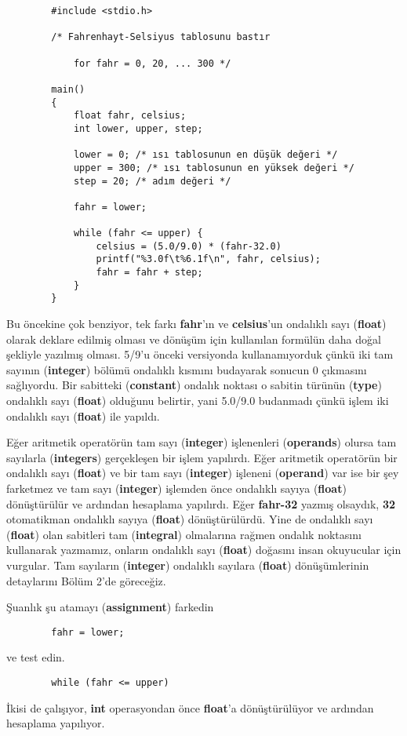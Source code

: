 \documentclass[a4paper,12pt,oneside]{book}
\begin{document}
\begin{lstlisting}
        #include <stdio.h>

        /* Fahrenhayt-Selsiyus tablosunu bastır

            for fahr = 0, 20, ... 300 */

        main()
        {
            float fahr, celsius;
            int lower, upper, step;

            lower = 0; /* ısı tablosunun en düşük değeri */
            upper = 300; /* ısı tablosunun en yüksek değeri */
            step = 20; /* adım değeri */

            fahr = lower;

            while (fahr <= upper) {
                celsius = (5.0/9.0) * (fahr-32.0)
                printf("%3.0f\t%6.1f\n", fahr, celsius);
                fahr = fahr + step;
            }
        }
\end{lstlisting}
\par Bu öncekine çok benziyor, tek farkı \textbf{fahr}'ın ve \textbf{celsius}'un ondalıklı sayı (\textbf{float}) olarak deklare edilmiş olması ve dönüşüm için kullanılan formülün daha doğal şekliyle yazılmış olması. 5/9'u önceki versiyonda kullanamıyorduk çünkü iki tam sayının (\textbf{integer}) bölümü ondalıklı kısmını budayarak sonucun 0 çıkmasını sağlıyordu. Bir sabitteki (\textbf{constant}) ondalık noktası o sabitin türünün (\textbf{type}) ondalıklı sayı (\textbf{float}) olduğunu belirtir, yani 5.0/9.0 budanmadı çünkü işlem iki ondalıklı sayı (\textbf{float}) ile yapıldı.
\par Eğer aritmetik operatörün tam sayı (\textbf{integer}) işlenenleri (\textbf{operands}) olursa tam sayılarla (\textbf{integers}) gerçekleşen bir işlem yapılırdı. Eğer aritmetik operatörün bir ondalıklı sayı (\textbf{float}) ve bir tam sayı (\textbf{integer}) işleneni (\textbf{operand}) var ise bir şey farketmez ve tam sayı (\textbf{integer}) işlemden önce ondalıklı sayıya (\textbf{float}) dönüştürülür ve ardından hesaplama yapılırdı. Eğer \textbf{fahr-32} yazmış olsaydık, \textbf{32} otomatikman ondalıklı sayıya (\textbf{float}) dönüştürülürdü. Yine de ondalıklı sayı (\textbf{float}) olan sabitleri tam (\textbf{integral}) olmalarına rağmen ondalık noktasını kullanarak yazmamız, onların ondalıklı sayı (\textbf{float}) doğasını insan okuyucular için vurgular. Tam sayıların (\textbf{integer}) ondalıklı sayılara (\textbf{float}) dönüşümlerinin detaylarını Bölüm 2'de göreceğiz.


\pagebreak Şuanlık şu atamayı (\textbf{assignment}) farkedin
\begin{lstlisting}
        fahr = lower;
\end{lstlisting} ve test edin.
\begin{lstlisting}
        while (fahr <= upper)
\end{lstlisting} İkisi de çalışıyor, \textbf{int} operasyondan önce \textbf{float}'a dönüştürülüyor ve ardından hesaplama yapılıyor.
\end{document}
